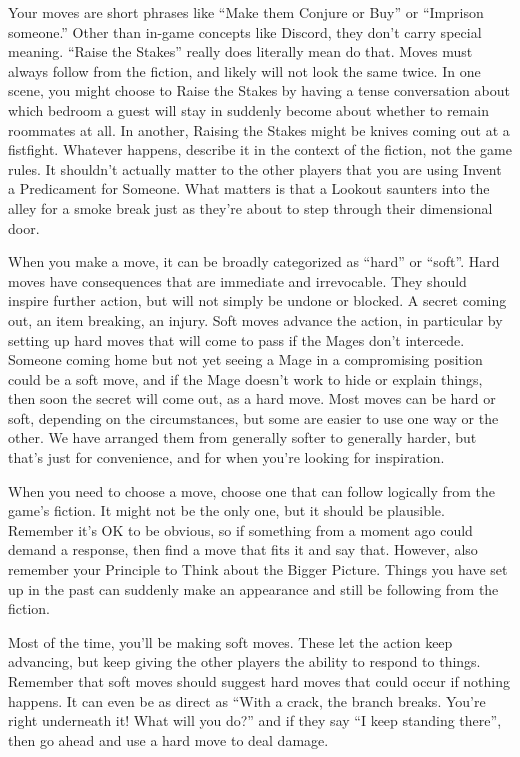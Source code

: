 \documentclass[
  oneside,
  statementpaper,
  9pt]{memoir}
\begin{document}
Your moves are short phrases like ``Make them Conjure or Buy'' or
``Imprison someone.'' Other than in-game concepts like Discord, they
don't carry special meaning. ``Raise the Stakes'' really does literally
mean do that. Moves must always follow from the fiction, and likely will
not look the same twice. In one scene, you might choose to Raise the
Stakes by having a tense conversation about which bedroom a guest will
stay in suddenly become about whether to remain roommates at all. In
another, Raising the Stakes might be knives coming out at a fistfight.
Whatever happens, describe it in the context of the fiction, not the
game rules. It shouldn't actually matter to the other players that you
are using Invent a Predicament for Someone. What matters is that a
Lookout saunters into the alley for a smoke break just as they're about
to step through their dimensional door.

When you make a move, it can be broadly categorized as ``hard'' or
``soft''. Hard moves have consequences that are immediate and
irrevocable. They should inspire further action, but will not simply be
undone or blocked. A secret coming out, an item breaking, an injury.
Soft moves advance the action, in particular by setting up hard moves
that will come to pass if the Mages don't intercede. Someone coming home
but not yet seeing a Mage in a compromising position could be a soft
move, and if the Mage doesn't work to hide or explain things, then soon
the secret will come out, as a hard move. Most moves can be hard or
soft, depending on the circumstances, but some are easier to use one way
or the other. We have arranged them from generally softer to generally
harder, but that's just for convenience, and for when you're looking for
inspiration.

When you need to choose a move, choose one that can follow logically
from the game's fiction. It might not be the only one, but it should be
plausible. Remember it's OK to be obvious, so if something from a moment
ago could demand a response, then find a move that fits it and say that.
However, also remember your Principle to Think about the Bigger Picture.
Things you have set up in the past can suddenly make an appearance and
still be following from the fiction.

Most of the time, you'll be making soft moves. These let the action keep
advancing, but keep giving the other players the ability to respond to
things. Remember that soft moves should suggest hard moves that could
occur if nothing happens. It can even be as direct as ``With a crack,
the branch breaks. You're right underneath it! What will you do?'' and
if they say ``I keep standing there'', then go ahead and use a hard move
to deal damage.
\end{document}
